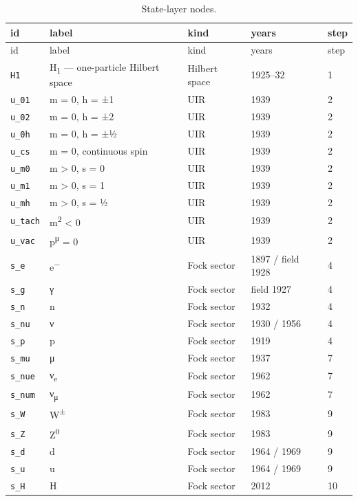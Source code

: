 \begin{longtable}{@{}l>{\raggedright\arraybackslash}p{7.6cm}lll@{}}
\caption{State-layer nodes.}\label{tab:nodesS}\\
\toprule id & label & kind & years & step\\\midrule\endfirsthead
\toprule id & label & kind & years & step\\\midrule\endhead
\bottomrule\endfoot
\texttt{H1} & H\textsubscript{1} — one-particle Hilbert space & Hilbert space & 1925–32 & 1\\
\texttt{u\_01} & m = 0, h = ±1 & UIR & 1939 & 2\\
\texttt{u\_02} & m = 0, h = ±2 & UIR & 1939 & 2\\
\texttt{u\_0h} & m = 0, h = ±½ & UIR & 1939 & 2\\
\texttt{u\_cs} & m = 0, continuous spin & UIR & 1939 & 2\\
\texttt{u\_m0} & m > 0, s = 0 & UIR & 1939 & 2\\
\texttt{u\_m1} & m > 0, s = 1 & UIR & 1939 & 2\\
\texttt{u\_mh} & m > 0, s = ½ & UIR & 1939 & 2\\
\texttt{u\_tach} & m\textsuperscript{2} < 0 & UIR & 1939 & 2\\
\texttt{u\_vac} & p\textsuperscript{μ} = 0 & UIR & 1939 & 2\\
\texttt{s\_e} & e\textsuperscript{−} & Fock sector & 1897 / field 1928 & 4\\
\texttt{s\_g} & γ & Fock sector & field 1927 & 4\\
\texttt{s\_n} & n & Fock sector & 1932 & 4\\
\texttt{s\_nu} & ν & Fock sector & 1930 / 1956 & 4\\
\texttt{s\_p} & p & Fock sector & 1919 & 4\\
\texttt{s\_mu} & μ & Fock sector & 1937 & 7\\
\texttt{s\_nue} & ν\textsubscript{e} & Fock sector & 1962 & 7\\
\texttt{s\_num} & ν\textsubscript{μ} & Fock sector & 1962 & 7\\
\texttt{s\_W} & W\textsuperscript{±} & Fock sector & 1983 & 9\\
\texttt{s\_Z} & Z\textsuperscript{0} & Fock sector & 1983 & 9\\
\texttt{s\_d} & d & Fock sector & 1964 / 1969 & 9\\
\texttt{s\_u} & u & Fock sector & 1964 / 1969 & 9\\
\texttt{s\_H} & H & Fock sector & 2012 & 10\\
\end{longtable}
